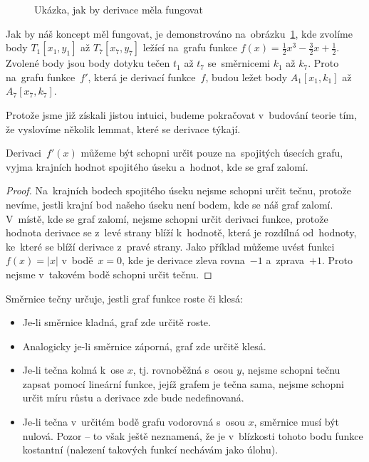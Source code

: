 \begin{figure}[ht!]
    \centering
    
    \caption{Ukázka, jak by derivace měla fungovat}
    \label{fig:derivace-tecny}
\end{figure}

Jak by náš koncept měl fungovat, je demonstrováno na~obrázku~\ref{fig:derivace-tecny},
kde zvolíme body $T_1[x_1, y_1]$ až $T_7[x_7, y_7]$ ležící na~grafu funkce
${f(x) = \frac{1}{2} x^3 - \frac{3}{2} x + \frac{1}{2}}$.
Zvolené body jsou body dotyku tečen $t_1$ až $t_7$ se~směrnicemi $k_1$ až $k_7$.
Proto na~grafu funkce~$f'$, která je derivací funkce~$f$, budou ležet body
$A_1[x_1, k_1]$ až $A_7[x_7, k_7]$.

Protože jsme již získali jistou intuici, budeme pokračovat v~budování teorie tím, že
vyslovíme několik lemmat, které se derivace týkají.

\begin{lemma}
    Derivaci~$f'(x)$ můžeme být schopni určit pouze na~spojitých úsecích grafu, vyjma
    krajních hodnot spojitého úseku a~hodnot, kde se graf zalomí.

    \begin{proof}
        Na~krajních bodech spojitého úseku nejsme schopni určit tečnu, protože nevíme,
        jestli krajní bod našeho úseku není bodem, kde se náš graf zalomí.
        V~místě, kde se graf zalomí, nejsme schopni určit derivaci funkce, protože
        hodnota derivace se z~levé strany blíží k~hodnotě, která je rozdílná
        od~hodnoty, ke~které se blíží derivace z~pravé strany.
        Jako příklad můžeme uvést funkci~${f(x) = |x|}$ v~bodě~${x = 0}$, kde je
        derivace zleva rovna~$-1$ a~zprava~$+1$.
        Proto nejsme v~takovém bodě schopni určit tečnu.
    \end{proof}
\end{lemma}

\begin{lemma}
    Směrnice tečny určuje, jestli graf funkce roste či klesá:
    \begin{itemize}
        \item Je-li směrnice kladná, graf zde určitě roste.
        \item Analogicky je-li směrnice záporná, graf zde určitě klesá.
        \item Je-li tečna kolmá k~ose $x$, tj. rovnoběžná s~osou $y$, nejsme
        schopni tečnu zapsat pomocí lineární funkce, jejíž grafem je tečna
        sama, nejsme schopni určit míru růstu a derivace zde bude nedefinovaná.
        \item Je-li tečna v~určitém bodě grafu vodorovná s~osou $x$, směrnice
        musí být nulová. Pozor -- to však ještě neznamená, že je v~blízkosti
        tohoto bodu funkce kostantní (nalezení takových funkcí nechávám jako
        úlohu).
    \end{itemize}
\end{lemma}

